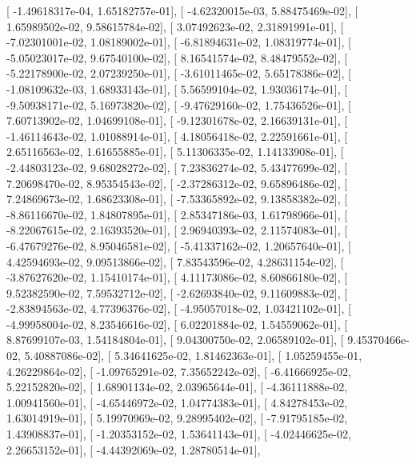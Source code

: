 \documentclass{article}
\begin{document}
       [ -1.49618317e-04,   1.65182757e-01],
       [ -4.62320015e-03,   5.88475469e-02],
       [  1.65989502e-02,   9.58615784e-02],
       [  3.07492623e-02,   2.31891991e-01],
       [ -7.02301001e-02,   1.08189002e-01],
       [ -6.81894631e-02,   1.08319774e-01],
       [ -5.05023017e-02,   9.67540100e-02],
       [  8.16541574e-02,   8.48479552e-02],
       [ -5.22178900e-02,   2.07239250e-01],
       [ -3.61011465e-02,   5.65178386e-02],
       [ -1.08109632e-03,   1.68933143e-01],
       [  5.56599104e-02,   1.93036174e-01],
       [ -9.50938171e-02,   5.16973820e-02],
       [ -9.47629160e-02,   1.75436526e-01],
       [  7.60713902e-02,   1.04699108e-01],
       [ -9.12301678e-02,   2.16639131e-01],
       [ -1.46114643e-02,   1.01088914e-01],
       [  4.18056418e-02,   2.22591661e-01],
       [  2.65116563e-02,   1.61655885e-01],
       [  5.11306335e-02,   1.14133908e-01],
       [ -2.44803123e-02,   9.68028272e-02],
       [  7.23836274e-02,   5.43477699e-02],
       [  7.20698470e-02,   8.95354543e-02],
       [ -2.37286312e-02,   9.65896486e-02],
       [  7.24869673e-02,   1.68623308e-01],
       [ -7.53365892e-02,   9.13858382e-02],
       [ -8.86116670e-02,   1.84807895e-01],
       [  2.85347186e-03,   1.61798966e-01],
       [ -8.22067615e-02,   2.16393520e-01],
       [  2.96940393e-02,   2.11574083e-01],
       [ -6.47679276e-02,   8.95046581e-02],
       [ -5.41337162e-02,   1.20657640e-01],
       [  4.42594693e-02,   9.09513866e-02],
       [  7.83543596e-02,   4.28631154e-02],
       [ -3.87627620e-02,   1.15410174e-01],
       [  4.11173086e-02,   8.60866180e-02],
       [  9.52382590e-02,   7.59532712e-02],
       [ -2.62693840e-02,   9.11609883e-02],
       [ -2.83894563e-02,   4.77396376e-02],
       [ -4.95057018e-02,   1.03421102e-01],
       [ -4.99958004e-02,   8.23546616e-02],
       [  6.02201884e-02,   1.54559062e-01],
       [  8.87699107e-03,   1.54184804e-01],
       [  9.04300750e-02,   2.06589102e-01],
       [  9.45370466e-02,   5.40887086e-02],
       [  5.34641625e-02,   1.81462363e-01],
       [  1.05259455e-01,   4.26229864e-02],
       [ -1.09765291e-02,   7.35652242e-02],
       [ -6.41666925e-02,   5.22152820e-02],
       [  1.68901134e-02,   2.03965644e-01],
       [ -4.36111888e-02,   1.00941560e-01],
       [ -4.65446972e-02,   1.04774383e-01],
       [  4.84278453e-02,   1.63014919e-01],
       [  5.19970969e-02,   9.28995402e-02],
       [ -7.91795185e-02,   1.43908837e-01],
       [ -1.20353152e-02,   1.53641143e-01],
       [ -4.02446625e-02,   2.26653152e-01],
       [ -4.44392069e-02,   1.28780514e-01],
\end{document}
